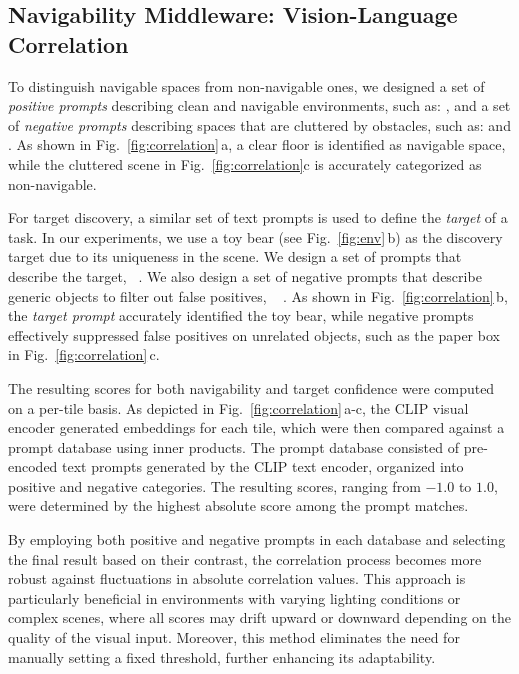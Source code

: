 \subsection{Navigability Middleware: Vision-Language Correlation}
To distinguish navigable spaces from non-navigable ones, we designed a set of \textit{positive prompts} describing clean and navigable environments, such as: , and a set of \textit{negative prompts} describing spaces that are cluttered by obstacles, such as:  and . As shown in Fig.~\ref{fig:correlation}\,a, a clear floor is identified as navigable space, while the cluttered scene in Fig.~\ref{fig:correlation}c is accurately categorized as non-navigable.

For target discovery, a similar set of text prompts is used to define the \textit{target} of a task. In our experiments, we use a toy bear (see Fig.~\ref{fig:env}\,b) as the discovery target due to its uniqueness in the scene. We design a set of prompts that describe the target, \eg~. We also design a set of negative prompts that describe generic objects to filter out false positives, \eg~ . As shown in Fig.~\ref{fig:correlation}\,b, the \textit{target prompt} accurately identified the toy bear, while negative prompts effectively suppressed false positives on unrelated objects, such as the paper box in Fig.~\ref{fig:correlation}\,c.

The resulting scores for both navigability and target confidence were computed on a per-tile basis. As depicted in Fig.~\ref{fig:correlation}\,a-c, the CLIP visual encoder generated embeddings for each tile, which were then compared against a prompt database using inner products. The prompt database consisted of pre-encoded text prompts generated by the CLIP text encoder, organized into positive and negative categories. The resulting scores, ranging from $-1.0$ to $1.0$, were determined by the highest absolute score among the prompt matches.

By employing both positive and negative prompts in each database and selecting the final result based on their contrast, the correlation process becomes more robust against fluctuations in absolute correlation values. This approach is particularly beneficial in environments with varying lighting conditions or complex scenes, where all scores may drift upward or downward depending on the quality of the visual input. Moreover, this method eliminates the need for manually setting a fixed threshold, further enhancing its adaptability.

